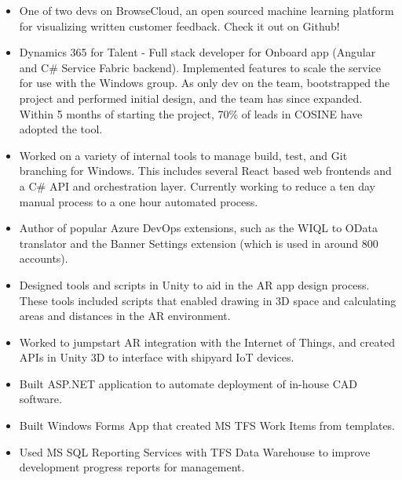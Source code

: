 \documentclass[10pt,a4paper]{altacv}
\begin{document}
\begin{itemize}
\item One of two devs on BrowseCloud, an open sourced machine learning platform for visualizing written customer feedback. Check it out on Github!
\item Dynamics 365 for Talent - Full stack developer for Onboard app (Angular and C\# Service Fabric backend). Implemented features to scale the service for use with the Windows group. As only dev on the team, bootstrapped the project and performed initial design, and the team has since expanded. Within 5 months of starting the project, 70\% of leads in COSINE have adopted the tool.
\item Worked on a variety of internal tools to manage build, test, and Git branching for Windows. This includes several React based web frontends and a C\# API and orchestration layer. Currently working to reduce a ten day manual process to a one hour automated process.
\item Author of popular Azure DevOps extensions, such as the WIQL to OData translator and the Banner Settings extension (which is used in around 800 accounts).
\end{itemize}

\divider

\begin{itemize}
\item Designed tools and scripts in Unity to aid in the AR app design process. These tools included scripts that enabled drawing in 3D space and calculating areas and distances in the AR environment.
\item Worked to jumpstart AR integration with the Internet of Things, and created APIs in Unity 3D to interface with shipyard IoT devices.
\end{itemize}

\divider


\begin{itemize}
\item Built ASP.NET application to automate deployment of in-house CAD software.
\item Built Windows Forms App that created MS TFS Work Items from templates.
\item Used MS SQL Reporting Services with TFS Data Warehouse to improve development progress reports for management.
\end{itemize}
\end{document}
